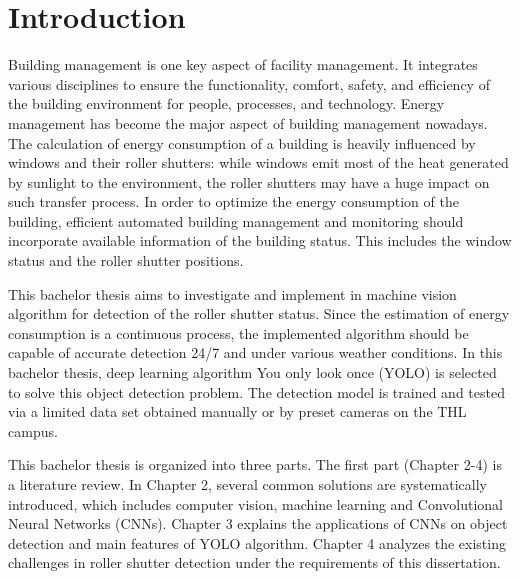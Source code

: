 \chapter{Introduction}

Building management is one key aspect of facility management. It integrates various disciplines to ensure the functionality, comfort, safety, and efficiency of the building environment for people, processes, and technology. Energy management has become the major aspect of building management nowadays. The calculation of energy consumption of a building is heavily influenced by windows and their roller shutters: while windows emit most of the heat generated by sunlight to the environment, the roller shutters may have a huge impact on such transfer process. In order to optimize the energy consumption of the building, efficient automated building management and monitoring should incorporate available information of the building status. This includes the window status and the roller shutter positions.

 This bachelor thesis aims to investigate and implement in machine vision algorithm for detection of the roller shutter status. Since the estimation of energy consumption is a continuous process, the implemented algorithm should be capable of accurate detection 24/7 and under various weather conditions. In this bachelor thesis, deep learning algorithm You only look once (YOLO) is selected to solve this object detection problem. The detection model is trained and tested via a limited data set obtained manually or by preset cameras on the THL campus.

 This bachelor thesis is organized into three parts. The first part (Chapter 2-4) is a literature review. In Chapter 2, several common solutions are systematically introduced, which includes computer vision, machine learning and Convolutional Neural Networks (CNNs). Chapter 3 explains the applications of CNNs on object detection and main features of YOLO algorithm. Chapter 4 analyzes the existing challenges in roller shutter detection under the requirements of this dissertation.

